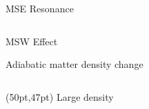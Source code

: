 \begin{frame}{MSE Resonance}
\begin{columns}[T]
\begin{column}{0.5\textwidth}
\begin{itemize}
\end{itemize}









\end{column}
\end{columns}







\end{frame}


\begin{frame}{MSW Effect}



\centering

\vspace{-1em}
Adiabatic matter density change

\begin{columns}[T]
\begin{column}{0.33\textwidth}

\begin{textblock*}{70pt}(50pt,47pt)
\small
Large density
\end{textblock*}




\end{column}
\end{columns}
\end{frame}
